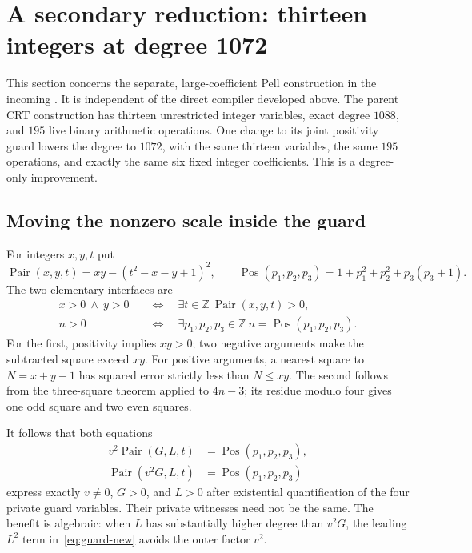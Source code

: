 \section{A secondary reduction: thirteen integers at degree 1072}
\label{sec:guard-supplement}

This section concerns the separate, large-coefficient Pell construction in
the incoming .
It is independent of the direct compiler developed above.
The parent CRT construction has thirteen unrestricted integer variables,
exact degree $1088$, and $195$ live binary arithmetic operations.
One change to its joint positivity guard lowers the degree to $1072$,
with the same thirteen variables, the same $195$ operations, and exactly
the same six fixed integer coefficients. This is a degree-only improvement.

\subsection{Moving the nonzero scale inside the guard}

For integers $x,y,t$ put
\[
 \operatorname{Pair}(x,y,t)=xy-(t^2-x-y+1)^2,
 \qquad
 \operatorname{Pos}(p_1,p_2,p_3)
 =1+p_1^2+p_2^2+p_3(p_3+1).
\]
The two elementary interfaces are
\begin{align*}
 x>0\ \land\ y>0
 &\quad\Longleftrightarrow\quad
 \exists t\in\mathbb Z\ \operatorname{Pair}(x,y,t)>0,\\
 n>0
 &\quad\Longleftrightarrow\quad
 \exists p_1,p_2,p_3\in\mathbb Z\
 n=\operatorname{Pos}(p_1,p_2,p_3).
\end{align*}
For the first, positivity implies $xy>0$; two negative arguments make the
subtracted square exceed $xy$. For positive arguments, a nearest square
to $N=x+y-1$ has squared error strictly less than $N\le xy$.
The second follows from the three-square theorem applied to $4n-3$;
its residue modulo four gives one odd square and two even squares.

It follows that both equations
\begin{align}
 v^2\operatorname{Pair}(G,L,t)
   &=\operatorname{Pos}(p_1,p_2,p_3),\label{eq:guard-old}\\
 \operatorname{Pair}(v^2G,L,t)
   &=\operatorname{Pos}(p_1,p_2,p_3)\label{eq:guard-new}
\end{align}
express exactly $v\ne0$, $G>0$, and $L>0$ after existential
quantification of the four private guard variables. Their private
witnesses need not be the same. The benefit is algebraic: when $L$
has substantially higher degree than $v^2G$, the leading $L^2$ term
in~\eqref{eq:guard-new} avoids the outer factor $v^2$.

